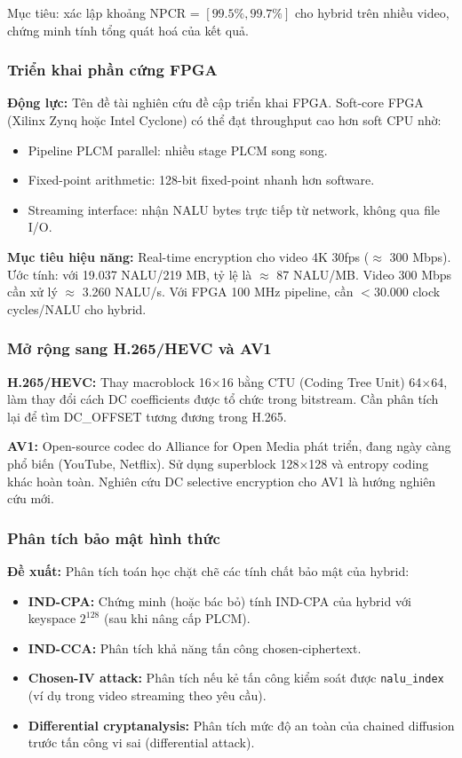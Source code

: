 Mục tiêu: xác lập khoảng NPCR = $[99.5\%, 99.7\%]$ cho hybrid trên nhiều video,
chứng minh tính tổng quát hoá của kết quả.

\subsubsection{Triển khai phần cứng FPGA}

\textbf{Động lực:} Tên đề tài nghiên cứu đề cập triển khai FPGA. Soft-core FPGA
(Xilinx Zynq hoặc Intel Cyclone) có thể đạt throughput cao hơn soft CPU nhờ:
\begin{itemize}
  \item Pipeline PLCM parallel: nhiều stage PLCM song song.
  \item Fixed-point arithmetic: 128-bit fixed-point nhanh hơn software.
  \item Streaming interface: nhận NALU bytes trực tiếp từ network, không qua file I/O.
\end{itemize}

\textbf{Mục tiêu hiệu năng:} Real-time encryption cho video 4K 30fps ($\approx$ 300 Mbps).
Ước tính: với 19.037 NALU/219 MB, tỷ lệ là $\approx$ 87 NALU/MB. Video 300 Mbps
cần xử lý $\approx$ 3.260 NALU/s. Với FPGA 100 MHz pipeline, cần $< 30.000$
clock cycles/NALU cho hybrid.

\subsubsection{Mở rộng sang H.265/HEVC và AV1}

\textbf{H.265/HEVC:} Thay macroblock 16$\times$16 bằng CTU (Coding Tree Unit)
64$\times$64, làm thay đổi cách DC coefficients được tổ chức trong bitstream.
Cần phân tích lại để tìm DC\_OFFSET tương đương trong H.265.

\textbf{AV1:} Open-source codec do Alliance for Open Media phát triển,
đang ngày càng phổ biến (YouTube, Netflix). Sử dụng superblock 128$\times$128
và entropy coding khác hoàn toàn. Nghiên cứu DC selective encryption cho AV1
là hướng nghiên cứu mới.

\subsubsection{Phân tích bảo mật hình thức}

\textbf{Đề xuất:} Phân tích toán học chặt chẽ các tính chất bảo mật của hybrid:
\begin{itemize}
  \item \textbf{IND-CPA:} Chứng minh (hoặc bác bỏ) tính IND-CPA của hybrid
        với keyspace $2^{128}$ (sau khi nâng cấp PLCM).
  \item \textbf{IND-CCA:} Phân tích khả năng tấn công chosen-ciphertext.
  \item \textbf{Chosen-IV attack:} Phân tích nếu kẻ tấn công kiểm soát được
        \texttt{nalu\_index} (ví dụ trong video streaming theo yêu cầu).
  \item \textbf{Differential cryptanalysis:} Phân tích mức độ an toàn của
        chained diffusion trước tấn công vi sai (differential attack).
\end{itemize}

